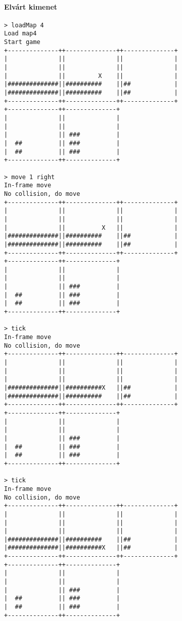 		        \paragraph*{Elvárt kimenet}
\begin{verbatim}
> loadMap 4
Load map4
Start game
+--------------++--------------++--------------+
|              ||              ||              |
|              ||              ||              |
|              ||         X    ||              |
|##############||##########    ||##            |
|##############||##########    ||##            |
+--------------++--------------++--------------+
+--------------++--------------+                
|              ||              |                
|              ||              |                
|              || ###          |                
|  ##          || ###          |                
|  ##          || ###          |                
+--------------++--------------+                

> move 1 right
In-frame move
No collision, do move
+--------------++--------------++--------------+
|              ||              ||              |
|              ||              ||              |
|              ||          X   ||              |
|##############||##########    ||##            |
|##############||##########    ||##            |
+--------------++--------------++--------------+
+--------------++--------------+                
|              ||              |                
|              ||              |                
|              || ###          |                
|  ##          || ###          |                
|  ##          || ###          |                
+--------------++--------------+                

> tick
In-frame move
No collision, do move
+--------------++--------------++--------------+
|              ||              ||              |
|              ||              ||              |
|              ||              ||              |
|##############||##########X   ||##            |
|##############||##########    ||##            |
+--------------++--------------++--------------+
+--------------++--------------+                
|              ||              |                
|              ||              |                
|              || ###          |                
|  ##          || ###          |                
|  ##          || ###          |                
+--------------++--------------+                

> tick
In-frame move
No collision, do move
+--------------++--------------++--------------+
|              ||              ||              |
|              ||              ||              |
|              ||              ||              |
|##############||##########    ||##            |
|##############||##########X   ||##            |
+--------------++--------------++--------------+
+--------------++--------------+                
|              ||              |                
|              ||              |                
|              || ###          |                
|  ##          || ###          |                
|  ##          || ###          |                
+--------------++--------------+                


\end{verbatim}
